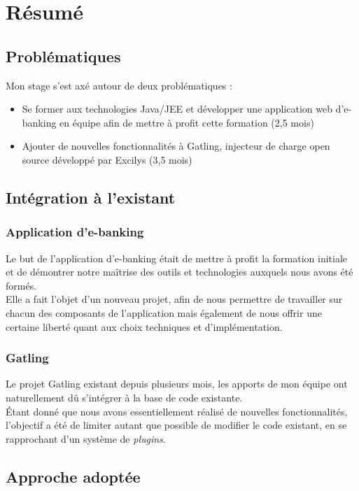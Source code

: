\section{Résumé}

\subsection{Problématiques}

Mon stage s'est axé autour de deux problématiques :
\begin{itemize}
	\item Se former aux technologies Java/JEE et développer une application web d'e-banking  en équipe afin de mettre à profit cette formation (2,5 mois)
	\item Ajouter de nouvelles fonctionnalités à Gatling, injecteur de charge open source développé par Excilys (3,5 mois)
\end{itemize}

\subsection{Intégration à l'existant}

\subsubsection*{Application d'e-banking}

Le but de l'application d'e-banking était de mettre à profit la formation initiale et de démontrer notre maîtrise des outils et technologies auxquels nous avons été formés.\\
Elle a fait l'objet d'un nouveau projet, afin de nous permettre de travailler sur chacun des composants de l'application mais également de nous offrir une certaine liberté quant aux choix techniques et d'implémentation.

\subsubsection*{Gatling}
Le projet Gatling existant depuis plusieurs mois, les apports de mon équipe ont naturellement dû s'intégrer à la base de code existante.\\
\'Etant donné que nous avons essentiellement réalisé de nouvelles fonctionnalités, l'objectif a été de limiter autant que possible de modifier le code existant, en se rapprochant d'un système de \textit{plugins}.

\subsection{Approche adoptée}

